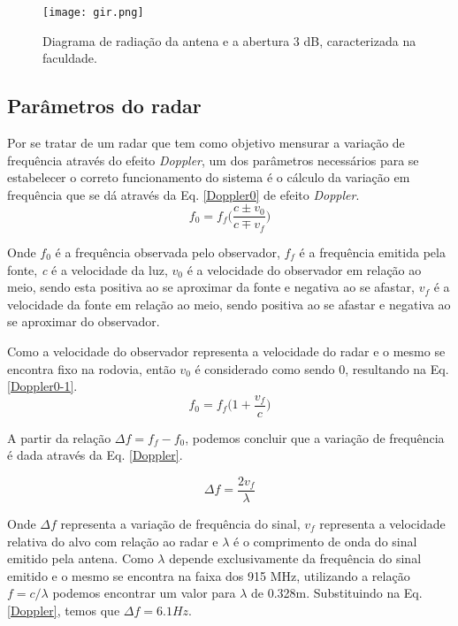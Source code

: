\begin{figure}[H]
    \centering
   \texttt{[image: gir.png]}
   \caption{Diagrama de radiação da antena e a
abertura 3 dB, caracterizada na faculdade.}
   \label{dr}
    \end{figure}


\subsection{Parâmetros do radar}


 Por se tratar de um radar que tem como objetivo mensurar a variação de frequência através do efeito \emph{Doppler}, um dos parâmetros necessários para se estabelecer o correto funcionamento do sistema é o cálculo da variação em frequência que se dá através da Eq. \ref{Doppler0} de efeito \emph{Doppler}\cite{young2009fisica}.
\begin{equation}\label{Doppler0} 
  f_0 = f_f \Big(\frac{c \pm v_0}{c \mp v_f} \Big)
\end{equation} 

Onde $f_0$ é a frequência observada pelo observador, $f_f$ é a frequência emitida pela fonte, \emph{c} é a velocidade da luz, $v_0$ é a velocidade do observador em relação ao meio, sendo esta positiva ao se aproximar da fonte e negativa ao se afastar, $v_f$ é a velocidade da fonte em relação ao meio, sendo positiva ao se afastar e negativa ao se aproximar do observador.

Como a velocidade do observador representa a velocidade do radar e o mesmo se encontra fixo na rodovia, então $v_0$ é considerado como sendo 0, resultando na Eq. \ref{Doppler0-1}.
\begin{equation}\label{Doppler0-1} 
  f_0 = f_f \Big(1 + \frac{v_f}{c} \Big)
\end{equation}

A partir da relação $\Delta f = f_{f} - f_{0}$, podemos concluir que a variação de frequência é dada através da Eq. \ref{Doppler}.

\begin{equation}\label{Doppler} 
  \Delta f =  \frac{2v_f}{\lambda}
\end{equation} 

Onde $\Delta f$ representa a variação de frequência do sinal, $v_f$ representa a velocidade relativa do alvo com relação ao radar e $\lambda$ é o comprimento de onda do sinal emitido pela antena. Como $\lambda$ depende exclusivamente da frequência do sinal emitido e o mesmo se encontra na faixa dos 915 MHz, utilizando a relação $f=c/\lambda$  podemos encontrar um valor para $\lambda$ de 0.328m. Substituindo na Eq. \ref{Doppler}, temos que $\Delta f = 6.1 Hz$.

